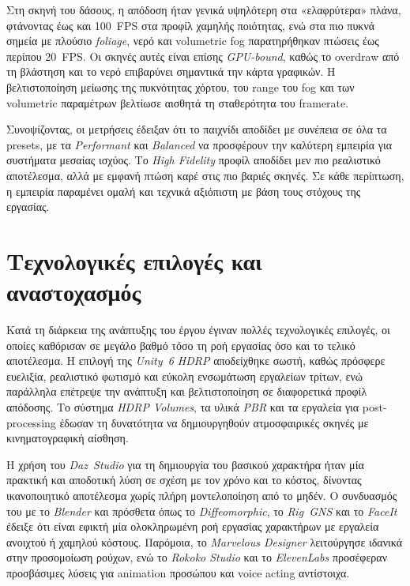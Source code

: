 Στη σκηνή του δάσους, η απόδοση ήταν γενικά υψηλότερη στα «ελαφρύτερα» πλάνα, 
φτάνοντας έως και 100~FPS στα προφίλ χαμηλής ποιότητας, 
ενώ στα πιο πυκνά σημεία με πλούσιο \textit{foliage}, νερό και volumetric fog 
παρατηρήθηκαν πτώσεις έως περίπου 20~FPS. 
Οι σκηνές αυτές είναι επίσης \textit{GPU-bound}, 
καθώς το overdraw από τη βλάστηση και το νερό επιβαρύνει σημαντικά 
την κάρτα γραφικών. 
Η βελτιστοποίηση μείωσης της πυκνότητας χόρτου, του range του fog 
και των volumetric παραμέτρων βελτίωσε αισθητά τη σταθερότητα του framerate.

Συνοψίζοντας, οι μετρήσεις έδειξαν ότι το παιχνίδι αποδίδει 
με συνέπεια σε όλα τα presets, 
με τα \textit{Performant} και \textit{Balanced} να προσφέρουν 
την καλύτερη εμπειρία για συστήματα μεσαίας ισχύος. 
Το \textit{High Fidelity} προφίλ αποδίδει μεν πιο ρεαλιστικό αποτέλεσμα, 
αλλά με εμφανή πτώση καρέ στις πιο βαριές σκηνές. 
Σε κάθε περίπτωση, η εμπειρία παραμένει ομαλή και τεχνικά αξιόπιστη 
με βάση τους στόχους της εργασίας.

\section{Τεχνολογικές επιλογές και αναστοχασμός}
Κατά τη διάρκεια της ανάπτυξης του έργου έγιναν πολλές τεχνολογικές επιλογές, 
οι οποίες καθόρισαν σε μεγάλο βαθμό τόσο τη ροή εργασίας όσο και το τελικό αποτέλεσμα. 
Η επιλογή της \textit{Unity~6 HDRP} αποδείχθηκε σωστή, 
καθώς πρόσφερε ευελιξία, ρεαλιστικό φωτισμό και εύκολη ενσωμάτωση 
εργαλείων τρίτων, ενώ παράλληλα επέτρεψε την ανάπτυξη και βελτιστοποίηση 
σε διαφορετικά προφίλ απόδοσης. 
Το σύστημα \textit{HDRP Volumes}, τα υλικά \textit{PBR} και τα εργαλεία 
για post-processing έδωσαν τη δυνατότητα να δημιουργηθούν 
ατμοσφαιρικές σκηνές με κινηματογραφική αίσθηση.

Η χρήση του \textit{Daz~Studio} για τη δημιουργία του βασικού χαρακτήρα 
ήταν μία πρακτική και αποδοτική λύση σε σχέση με τον χρόνο και το κόστος, 
δίνοντας ικανοποιητικό αποτέλεσμα χωρίς πλήρη μοντελοποίηση από το μηδέν. 
Ο συνδυασμός του με το \textit{Blender} και πρόσθετα όπως το 
\textit{Diffeomorphic}, το \textit{Rig~GNS} και το \textit{FaceIt} 
έδειξε ότι είναι εφικτή μία ολοκληρωμένη ροή εργασίας χαρακτήρων 
με εργαλεία ανοιχτού ή χαμηλού κόστους. 
Παρόμοια, το \textit{Marvelous Designer} λειτούργησε ιδανικά 
στην προσομοίωση ρούχων, ενώ το \textit{Rokoko Studio} 
και το \textit{ElevenLabs} προσέφεραν προσβάσιμες λύσεις 
για animation προσώπου και voice acting αντίστοιχα.

